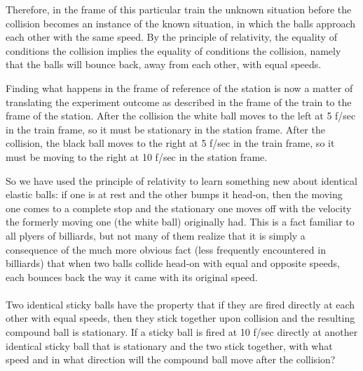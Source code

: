 Therefore, in the frame of this particular train the unknown situation before the collision becomes an instance of the known situation, in which the balls approach each other with the same speed. By the principle of relativity, the equality of conditions  the collision implies the equality of conditions  the collision, namely that the balls will bounce back, away from each other, with equal speeds. 

Finding what happens in the frame of reference of the station is now a matter of translating the experiment outcome as described in the frame of the train to the frame of the station. After the collision the white ball moves to the left at 5 f/sec in the train frame, so it must be stationary in the station frame. After the collision, the black ball moves to the right at 5 f/sec in the train frame, so it must be moving to the right at 10 f/sec in the station frame. 

So we have used the principle of relativity to learn something new about identical elastic balls: if one is at rest and the other bumps it head-on, then the moving one comes to a complete stop and the stationary one moves off with the velocity the formerly moving one (the white ball) originally had. This is a fact familiar to all plyers of billiards, but not many of them realize that it is simply a consequence of the much more obvious fact (less frequently encountered in billiards) that when two balls collide head-on with equal and opposite speeds, each bounces back the way it came with its original speed. 
\\\\
Two identical sticky balls have the property that if they are fired directly at each other with equal speeds, then they stick together upon collision and the resulting compound ball is stationary. If a sticky ball is fired at 10 f/sec directly at another identical sticky ball that is stationary and the two stick together, with what speed and in what direction will the compound ball move after the collision?

